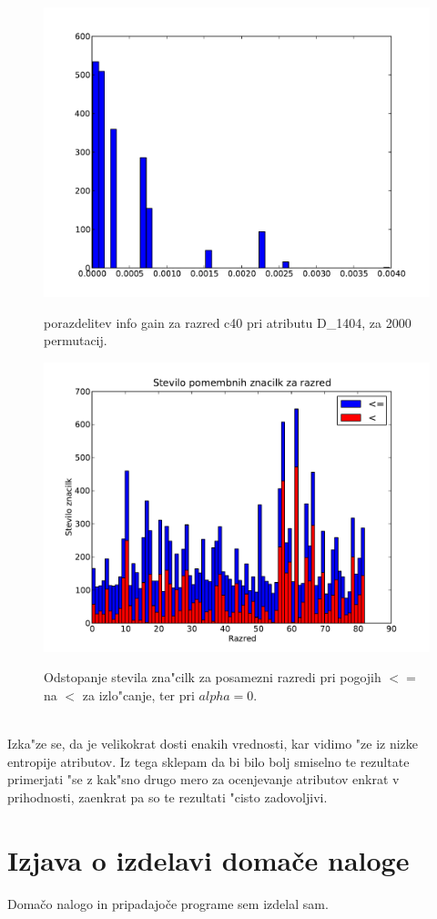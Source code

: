 \documentclass[a4paper,11pt]{article}
\begin{document}
\begin{figure}[H]
\begin{center}
\includegraphics[scale=0.4]{testc40D_1404Orange.pdf}
\caption{porazdelitev info gain za razred c40 pri atributu D\_1404, za 2000 permutacij.}
\label{slika1}
\includegraphics[scale=0.4]{muraawdva.pdf}
\caption{Odstopanje stevila zna"cilk za posamezni razredi pri pogojih $<=$ na $<$ za izlo"canje, ter pri $alpha=0$.}
\label{slika1}
\end{center}
\end{figure}\ \\[-40pt]

Izka"ze se, da je velikokrat dosti enakih vrednosti, kar vidimo "ze iz nizke entropije atributov. Iz tega sklepam da bi bilo bolj smiselno te rezultate primerjati "se z kak"sno drugo mero za ocenjevanje atributov enkrat v prihodnosti, zaenkrat pa so te rezultati "cisto zadovoljivi.


\section{Izjava o izdelavi domače naloge}
Domačo nalogo in pripadajoče programe sem izdelal sam.
\end{document}
